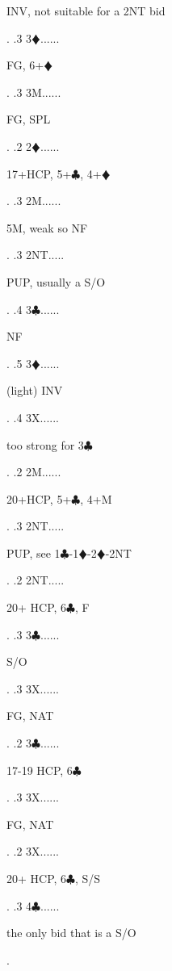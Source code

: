 \documentclass[a4paper]{article}
\newcommand{\BC}{\textcolor{OliveGreen}{$\clubsuit$}}
\newcommand{\BD}{\textcolor{RedOrange}{$\vardiamondsuit$}}
\begin{document}
{\begin{minipage}[t]{0.8\textwidth}
INV, not suitable for a 2NT bid
\end{minipage}. 
 .3 3\BD......\begin{minipage}[t]{0.8\textwidth}
FG, 6+\BD 
\end{minipage}. 
 .3 3M......\begin{minipage}[t]{0.8\textwidth}
FG, SPL
\end{minipage}. 
 .2 2\BD......\begin{minipage}[t]{0.8\textwidth}
17+HCP, 5+\BC , 4+\BD 
\end{minipage}. 
 .3 2M......\begin{minipage}[t]{0.8\textwidth}
5M, weak so NF
\end{minipage}. 
 .3 2NT.....\begin{minipage}[t]{0.8\textwidth}
PUP, usually a S/O
\end{minipage}. 
 .4 3\BC......\begin{minipage}[t]{0.8\textwidth}
NF
\end{minipage}. 
 .5 3\BD......\begin{minipage}[t]{0.8\textwidth}
(light) INV
\end{minipage}. 
 .4 3X......\begin{minipage}[t]{0.8\textwidth}
too strong for 3\BC 
\end{minipage}. 
 .2 2M......\begin{minipage}[t]{0.8\textwidth}
20+HCP, 5+\BC , 4+M
\end{minipage}. 
 .3 2NT.....\begin{minipage}[t]{0.8\textwidth}
PUP, see 1\BC -1\BD -2\BD -2NT
\end{minipage}. 
 .2 2NT.....\begin{minipage}[t]{0.8\textwidth}
20+ HCP, 6\BC , F
\end{minipage}. 
 .3 3\BC......\begin{minipage}[t]{0.8\textwidth}
S/O
\end{minipage}. 
 .3 3X......\begin{minipage}[t]{0.8\textwidth}
FG, NAT
\end{minipage}. 
 .2 3\BC......\begin{minipage}[t]{0.8\textwidth}
17-19 HCP, 6\BC 
\end{minipage}. 
 .3 3X......\begin{minipage}[t]{0.8\textwidth}
FG, NAT
\end{minipage}. 
 .2 3X......\begin{minipage}[t]{0.8\textwidth}
20+ HCP, 6\BC , S/S
\end{minipage}. 
 .3 4\BC......\begin{minipage}[t]{0.8\textwidth}
the only bid that is a S/O
\end{minipage}. 
}
\end{document}
